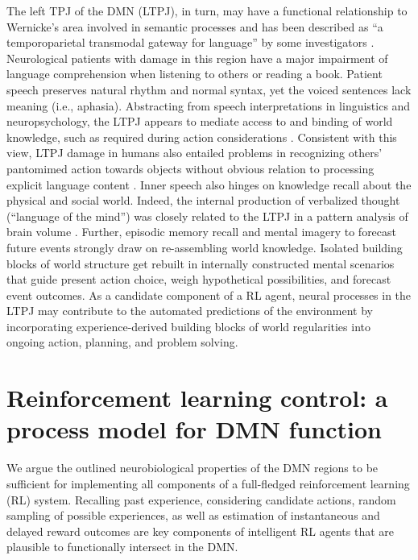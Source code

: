 \documentclass[10pt,letterpaper]{article}
\begin{document}
The left TPJ of the DMN (LTPJ),
in turn, may have a functional relationship to Wernicke's area
involved in semantic processes \citep{blumenfeld_book} and has
been described as ``a temporoparietal transmodal gateway for language''
by some investigators \citep{mesulam_book}.
Neurological patients with damage in this region
have a major impairment of language comprehension
when listening to others or reading a book.
Patient speech
preserves natural rhythm and normal syntax, yet the
voiced sentences lack meaning (i.e., aphasia).
Abstracting from speech interpretations in linguistics
and neuropsychology,
the LTPJ appears to mediate access to and binding of world knowledge,
such as required during action considerations
\citep{binder2011neurobiology, seghier2013angular}.
Consistent with this view,
LTPJ damage in humans also entailed problems in recognizing
others' pantomimed action towards objects
without obvious relation to processing explicit language content
\citep{varney1987locus}.
%
Inner speech also hinges on knowledge recall
about the physical and social world.
Indeed,
the internal production of
verbalized thought (``language of the mind'') was closely related to the LTPJ
in a pattern analysis of brain volume
\citep{geva2011neural}.
Further,
episodic memory recall and mental imagery to forecast future events strongly draw on
re-assembling world knowledge.
Isolated building blocks of world structure get rebuilt
in internally constructed mental scenarios that
guide present action choice,
weigh hypothetical possibilities, and forecast event outcomes.
%
As a candidate component of a RL agent,
neural processes in the LTPJ may
contribute to the automated predictions of the environment
by incorporating experience-derived building blocks of world regularities
into ongoing action, planning, and problem solving.



\section{Reinforcement learning control: a process model for DMN function}
We argue the outlined neurobiological properties
of the DMN regions
to be sufficient for implementing all components
of a full-fledged reinforcement learning (RL) system.
Recalling past experience, considering candidate actions,
random sampling of possible experiences, as well as
estimation of instantaneous and delayed reward outcomes
are key components of intelligent RL agents
that are plausible to functionally intersect in the DMN.
\end{document}
